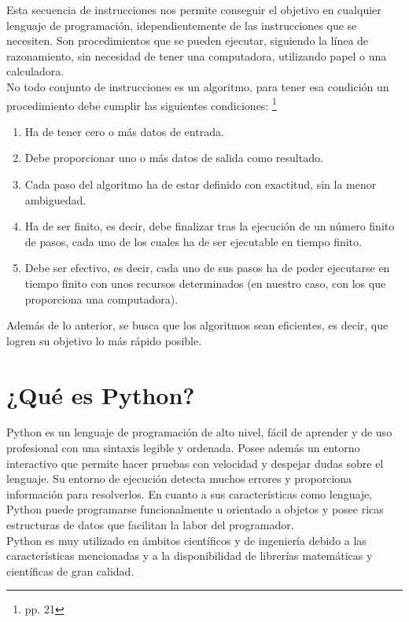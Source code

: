 Esta secuencia de instrucciones nos permite conseguir el objetivo en cualquier lenguaje de programación, idependientemente de las instrucciones que se necesiten. Son procedimientos que se pueden ejecutar, siguiendo la línea de razonamiento, sin necesidad de tener una computadora, utilizando papel o una calculadora.\\

No todo conjunto de instrucciones es un algoritmo, para tener esa condición un procedimiento debe cumplir las siguientes condiciones: \footnote{\cite{Marzal2003} pp. 21}

\begin{enumerate}
\item Ha de tener cero o más datos de entrada.
\item Debe proporcionar uno o más datos de salida como resultado.
\item Cada paso del algoritmo ha de estar definido con exactitud, sin la menor ambiguedad.
\item Ha de ser finito, es decir, debe finalizar tras la ejecución de un número finito de pasos, cada uno de los cuales ha de ser ejecutable en tiempo finito.
\item Debe ser efectivo, es decir, cada uno de sus pasos ha de poder ejecutarse en tiempo finito con unos recursos determinados (en nuestro caso, con los que proporciona una computadora).
\end{enumerate}

Además de lo anterior, se busca que los algoritmos sean eficientes, es decir, que logren su objetivo lo más rápido posible.

\section{¿Qué es Python?}

Python es un lenguaje de programación de alto nivel, fácil de aprender y de uso profesional con una sintaxis legible y ordenada. Posee además un entorno interactivo que permite hacer pruebas con velocidad y despejar dudas sobre el lenguaje. Su entorno de ejecución detecta muchos errores y proporciona información para resolverlos. En cuanto a sus características como lenguaje, Python puede programarse funcionalmente u orientado a objetos y posee ricas estructuras de datos que facilitan la labor del programador.\\

Python es muy utilizado en ámbitos científicos y de ingeniería debido a las características mencionadas y a la disponibilidad de librerías matemáticas y científicas de gran calidad.\\

